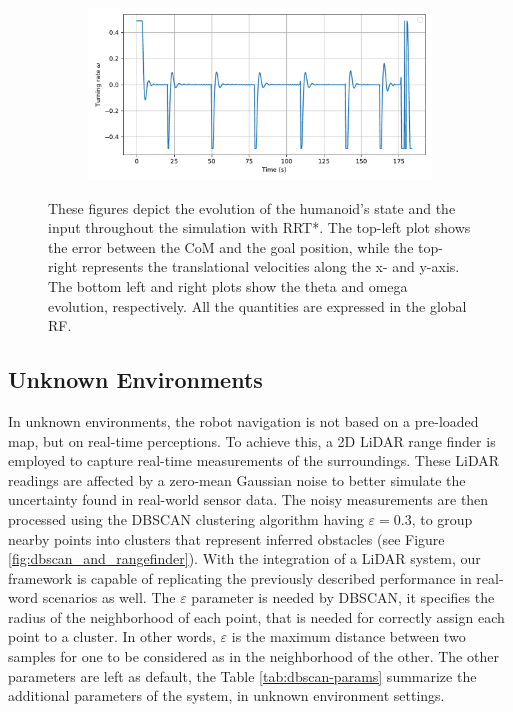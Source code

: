 \begin{figure}[H]
\begin{subfigure}{0.45\linewidth}
    \end{subfigure}
    \begin{subfigure}{0.45\linewidth}
        \centering
        \includegraphics[width=\linewidth]{figures/Simulations/sim_rrt/evolution_3.pdf}
    \end{subfigure}
    \caption{These figures depict the evolution of the humanoid's state and the input throughout the simulation with RRT*. The top-left plot shows the error between the CoM and the goal position, while the top-right represents the translational velocities along the x- and y-axis. The bottom left and right plots show the theta and omega evolution, respectively. All the quantities are expressed in the global RF.}
    \label{fig:sim_rrt_evol}
\end{figure}




\subsection{Unknown Environments}
In unknown environments, the robot navigation is not based on a pre-loaded map, but on real-time perceptions.
To achieve this, a 2D LiDAR range finder is employed to capture real-time measurements of the surroundings.
These LiDAR readings are affected by a zero-mean Gaussian noise to better simulate the uncertainty found in real-world sensor data.
The noisy measurements are then processed using the DBSCAN clustering algorithm having $\varepsilon = 0.3$, to
group nearby points into clusters that represent inferred obstacles (see Figure \ref{fig:dbscan_and_rangefinder}).
With the integration of a LiDAR system, our framework is capable of replicating the previously described performance
in real-word scenarios as well.
The $\varepsilon$ parameter is needed by DBSCAN, it specifies the radius of the neighborhood of each point, that is
needed for correctly assign each point to a cluster. In other words,
$\varepsilon$ is the maximum distance between two samples for
one to be considered as in the neighborhood of the other.
The other parameters are left as default, the Table \ref{tab:dbscan-params} summarize the additional parameters of the
system, in unknown environment settings.

